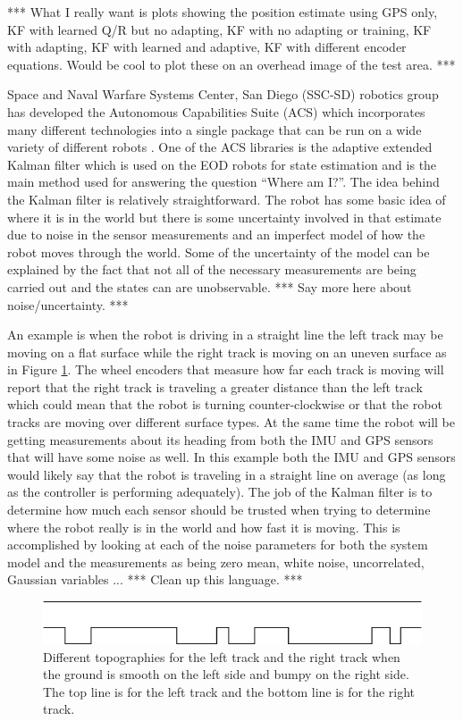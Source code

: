 \documentclass[12pt]{report}
\begin{document}
\begin{spacing}{1.1}
*** What I really want is plots showing the position estimate using GPS only, KF with learned Q/R but no adapting, KF with no adapting or training, KF with adapting, KF with learned and adaptive, KF with different encoder equations. Would be cool to plot these on an overhead image of the test area. ***

Space and Naval Warfare Systems Center, San Diego (SSC-SD) robotics group has developed the Autonomous Capabilities Suite (ACS) which incorporates many different technologies into a single package that can be run on a wide variety of different robots \cite{Sights06}. One of the ACS libraries is the adaptive extended Kalman filter which is used on the EOD robots for state estimation and is the main method used for answering the question ``Where am I?''. The idea behind the Kalman filter is relatively straightforward. The robot has some basic idea of where it is in the world but there is some uncertainty involved in that estimate due to noise in the sensor measurements and an imperfect model of how the robot moves through the world. Some of the uncertainty of the model can be explained by the fact that not all of the necessary measurements are being carried out and the states can are unobservable. *** Say more here about noise/uncertainty. ***

An example is when the robot is driving in a straight line the left track may be moving on a flat surface while the right track is moving on an uneven surface as in Figure \ref{fig:topography}. The wheel encoders that measure how far each track is moving will report that the right track is traveling a greater distance than the left track which could mean that the robot is turning counter-clockwise or that the robot tracks are moving over different surface types. At the same time the robot will be getting measurements about its heading from both the IMU and GPS sensors that will have some noise as well. In this example both the IMU and GPS sensors would likely say that the robot is traveling in a straight line on average (as long as the controller is performing adequately). The job of the Kalman filter is to determine how much each sensor should be trusted when trying to determine where the robot really is in the world and how fast it is moving. This is accomplished by looking at each of the noise parameters for both the system model and the measurements as being zero mean, white noise, uncorrelated, Gaussian variables ... *** Clean up this language. ***

\begin{figure}[ht!]
	\centering
	\includegraphics[width=.5\textwidth]{images/topography}
	\caption{Different topographies for the left track and the right track when the ground is smooth on the left side and bumpy on the right side. The top line is for the left track and the bottom line is for the right track.}
	\label{fig:topography}
\end{figure}


\end{spacing}
\end{document}
